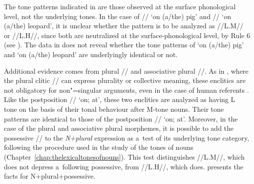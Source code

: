 The tone patterns indicated in  are those observed at the surface phonological level, not the underlying tones. In the case of // ‘on \mbox{(a/the)} pig' and // ‘on \mbox{(a/the)} leopard', it is unclear whether the pattern is to be analyzed as //L.M// or //L.H//, since both are neutralized at the surface-phonological level, by Rule 6 (see ). The data in  does not reveal whether the tone patterns of ‘on \mbox{(a/the)} pig' and ‘on \mbox{(a/the)} leopard' are underlyingly identical or not.

Additional evidence comes from plural
// and associative plural //. As in , where the plural clitic // can express plurality or collective meaning, these enclitics are not obligatory for non"=singular arguments, even in the case of human referents \citep{jacquesforth}. Like the postposition // ‘on; at', these two enclitics are analyzed as having L tone on the basis of their tonal behaviour after M-tone nouns. Their tone patterns are identical to those of the postposition // ‘on; at'. Moreover, in the case of the plural and associative plural morphemes, it is possible to add the {possessive} // to the \textit{N+{plural}} expression as a~test of its underlying tone category, following the procedure used in the study of the tones of nouns
(Chapter~\ref{chap:thelexicaltonesofnouns}). This test distinguishes //L.M//, which does not depress a~following {possessive}, from //L.H//, which does.  presents the
facts for N+{\allowbreak}{plural}+{\allowbreak}{possessive}. 

